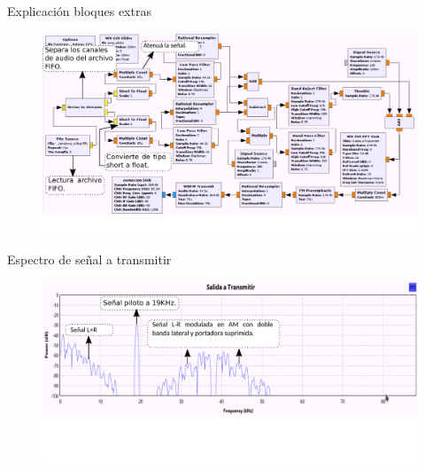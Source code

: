 \begin{frame}{Explicación bloques extras}

\begin{figure}[H]
\centering
\vspace{-3mm}
\includegraphics[width=\textwidth]{parte3/lab13/pdf/lab13_3.pdf}
\end{figure}
\end{frame}

\begin{frame}{Espectro de señal a transmitir}

\begin{figure}[H]
\centering
\vspace{-3mm}
\includegraphics[width=\textwidth]{parte3/lab13/pdf/lab13_4.pdf}
\end{figure}
\end{frame}
